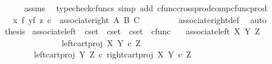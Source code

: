 \begin{isabellebody}
\ \ \ \ \isamarkupfalse%
\ assms\ \isamarkupfalse%
\ {\isacharparenleft}{\kern0pt}typecheck{\isacharunderscore}{\kern0pt}cfuncs{\isacharcomma}{\kern0pt}\ simp\ add{\isacharcolon}{\kern0pt}\ cfunc{\isacharunderscore}{\kern0pt}cross{\isacharunderscore}{\kern0pt}prod{\isacharunderscore}{\kern0pt}comp{\isacharunderscore}{\kern0pt}cfunc{\isacharunderscore}{\kern0pt}prod{\isacharparenright}{\kern0pt}\isanewline
\ \ \isamarkupfalse%
\ \isamarkupfalse%
\ {\isachardoublequoteopen}{\isachardot}{\kern0pt}{\isachardot}{\kern0pt}{\isachardot}{\kern0pt}\ {\isacharequal}{\kern0pt}\ {\isacharparenleft}{\kern0pt}x\ {\isasymtimes}\isactrlsub f\ {\isacharparenleft}{\kern0pt}y{\isasymtimes}\isactrlsub f\ z{\isacharparenright}{\kern0pt}{\isacharparenright}{\kern0pt}\ {\isasymcirc}\isactrlsub c\ \ associate{\isacharunderscore}{\kern0pt}right\ A\ B\ C{\isachardoublequoteclose}\ \ \ \isanewline
\ \ \ \ \isamarkupfalse%
\ associate{\isacharunderscore}{\kern0pt}right{\isacharunderscore}{\kern0pt}def\ \isamarkupfalse%
\ auto\isanewline
\ \ \isamarkupfalse%
\ \isamarkupfalse%
\ {\isacharquery}{\kern0pt}thesis\isacommand{{\isachardot}{\kern0pt}}\isamarkupfalse%
\isanewline
{}\isamarkupfalse%
%
\endisatagproof
{\isafoldproof}%
%
\isadelimproof
%
\endisadelimproof
%
\isadelimdocument
%
\endisadelimdocument
%
\isatagdocument
%
\isamarkuptrue%
%
\endisatagdocument
{\isafolddocument}%
%
\isadelimdocument
%
\endisadelimdocument
{}\isamarkupfalse%
\ associate{\isacharunderscore}{\kern0pt}left\ {\isacharcolon}{\kern0pt}{\isacharcolon}{\kern0pt}\ {\isachardoublequoteopen}cset\ {\isasymRightarrow}\ cset\ {\isasymRightarrow}\ cset\ {\isasymRightarrow}\ cfunc{\isachardoublequoteclose}\ \isanewline
\ \ {\isachardoublequoteopen}associate{\isacharunderscore}{\kern0pt}left\ X\ Y\ Z\ {\isacharequal}{\kern0pt}\isanewline
\ \ \ \ {\isasymlangle}\isanewline
\ \ \ \ \ \ {\isasymlangle}\isanewline
\ \ \ \ \ \ \ \ left{\isacharunderscore}{\kern0pt}cart{\isacharunderscore}{\kern0pt}proj\ X\ {\isacharparenleft}{\kern0pt}Y\ {\isasymtimes}\isactrlsub c\ Z{\isacharparenright}{\kern0pt}{\isacharcomma}{\kern0pt}\isanewline
\ \ \ \ \ \ \ \ left{\isacharunderscore}{\kern0pt}cart{\isacharunderscore}{\kern0pt}proj\ Y\ Z\ {\isasymcirc}\isactrlsub c\ right{\isacharunderscore}{\kern0pt}cart{\isacharunderscore}{\kern0pt}proj\ X\ {\isacharparenleft}{\kern0pt}Y\ {\isasymtimes}\isactrlsub c\ Z{\isacharparenright}{\kern0pt}\isanewline

\end{isabellebody}
